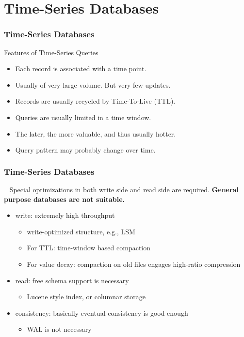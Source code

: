 \documentclass[lualatex]{beamer}
\renewcommand{\emph}{\textbf}
\begin{document}
\section{Time-Series Databases}
\frame{\tableofcontents[currentsection]}

\begin{frame}
  \frametitle{Time-Series Databases}
  \begin{block}{Features of Time-Series Queries}
    \begin{itemize}
      \item Each record is associated with a time point.
      \item Usually of very large volume. But very few updates.
      \item Records are usually recycled by Time-To-Live (TTL).
      \item Queries are usually limited in a time window.
      \item The later, the more valuable, and thus usually hotter.
      \item Query pattern may probably change over time.
    \end{itemize}
  \end{block}
\end{frame}

\begin{frame}
  \frametitle{Time-Series Databases}
  \begin{block}{~}
    Special optimizations in both write side and read side are required.
    \emph{General purpose databases are not suitable.}
    \begin{itemize}
      \item write: extremely high throughput
        \begin{itemize}
          \item<2> write-optimized structure, e.g., LSM
          \item<2> For TTL: time-window based compaction
          \item<2> For value decay: compaction on old files engages high-ratio compression
        \end{itemize}
      \item read: free schema support is necessary
        \begin{itemize}
          \item<2> Lucene style index, or columnar storage
        \end{itemize}
      \item consistency: basically eventual consistency is good enough
        \begin{itemize}
          \item<2> WAL is not necessary
        \end{itemize}
    \end{itemize}
  \end{block}
\end{frame}
\end{document}
